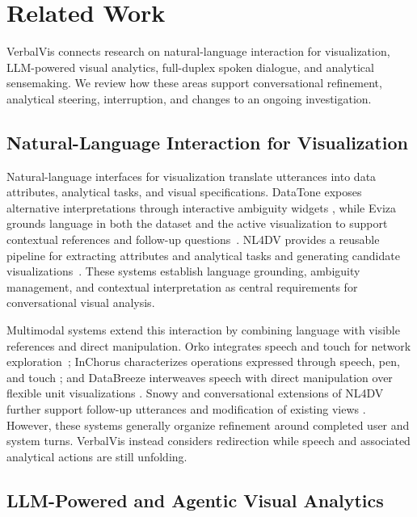 \documentclass[journal]{IEEEtran}
\begin{document}
\section{Related Work}
\label{sec:related}

VerbalVis connects research on natural-language interaction for visualization,
LLM-powered visual analytics, full-duplex spoken dialogue, and analytical
sensemaking. We review how these areas support conversational refinement,
analytical steering, interruption, and changes to an ongoing investigation.

\subsection{Natural-Language Interaction for Visualization}
\label{sec:rw-nli}

Natural-language interfaces for visualization translate utterances into data
attributes, analytical tasks, and visual specifications. DataTone exposes
alternative interpretations through interactive ambiguity widgets
\cite{gao2015datatone}, while Eviza grounds language in both the dataset and
the active visualization to support contextual references and follow-up
questions~\cite{setlur2016eviza}. NL4DV provides a reusable pipeline for
extracting attributes and analytical tasks and generating candidate
visualizations~\cite{narechania2021nl4dv}. These systems establish language
grounding, ambiguity management, and contextual interpretation as central
requirements for conversational visual analysis.

Multimodal systems extend this interaction by combining language with visible
references and direct manipulation. Orko integrates speech and touch for
network exploration~\cite{srinivasan2018orko}; InChorus characterizes
operations expressed through speech, pen, and touch
\cite{srinivasan2020inchorus}; and DataBreeze interweaves speech with direct
manipulation over flexible unit visualizations
\cite{srinivasan2021databreeze}. Snowy and conversational extensions of
NL4DV further support follow-up utterances and modification of existing views
\cite{srinivasan2021snowy,mitra2022conversational}. However, these systems
generally organize refinement around completed user and system turns.
VerbalVis instead considers redirection while speech and associated analytical
actions are still unfolding.

\subsection{LLM-Powered and Agentic Visual Analytics}
\label{sec:rw-agentic}
\end{document}
